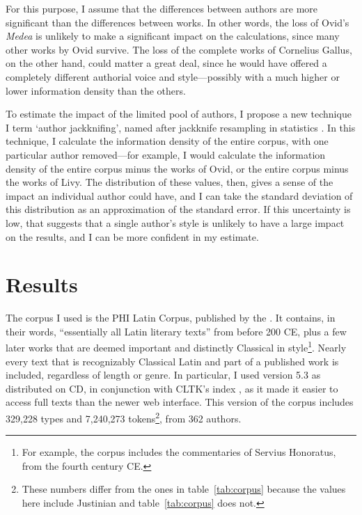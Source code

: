 \documentclass[12pt,twoside,leqno]{article} %
\begin{document}
For this purpose, I assume that the differences between authors are more significant than the differences between works. In other words, the loss of Ovid's \emph{Medea} is unlikely to make a significant impact on the calculations, since many other works by Ovid survive. The loss of the complete works of Cornelius Gallus, on the other hand, could matter a great deal, since he would have offered a completely different authorial voice and style---possibly with a much higher or lower information density than the others.

To estimate the impact of the limited pool of authors, I propose a new technique I term `author jackknifing', named after jackknife resampling in statistics \citep{efron}. In this technique, I calculate the information density of the entire corpus, with one particular author removed---for example, I would calculate the information density of the entire corpus minus the works of Ovid, or the entire corpus minus the works of Livy. The distribution of these values, then, gives a sense of the impact an individual author could have, and I can take the standard deviation of this distribution as an approximation of the standard error. If this uncertainty is low, that suggests that a single author's style is unlikely to have a large impact on the results, and I can be more confident in my estimate.

\section{Results}
\label{sec:res}

The corpus I used is the PHI Latin Corpus, published by the \citet{phi}. It contains, in their words, ``essentially all Latin literary texts'' from before 200 CE, plus a few later works that are deemed important and distinctly Classical in style\footnote{For example, the corpus includes the commentaries of Servius Honoratus, from the fourth century CE.}. Nearly every text that is recognizably Classical Latin and part of a published work is included, regardless of length or genre. In particular, I used version 5.3 as distributed on CD, in conjunction with CLTK's index \citep{cltk}, as it made it easier to access full texts than the newer web interface. This version of the corpus includes 329,228 types and 7,240,273 tokens\footnote{These numbers differ from the ones in table~\ref{tab:corpus} because the values here include Justinian and table~\ref{tab:corpus} does not.}, from 362 authors.
\end{document}
